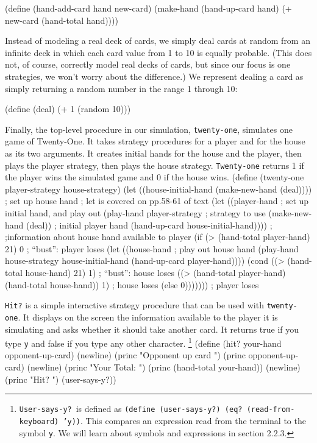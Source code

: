 \beginlisp
(define (hand-add-card hand new-card)
  (make-hand (hand-up-card hand)
             (+ new-card (hand-total hand))))
\endlisp

Instead of modeling a real deck of cards, we simply deal cards at
random from an infinite deck in which each card value from 1 to 10 is
equally probable.  (This does not, of course, correctly model real
decks of cards, but since our focus is one strategies, we won't worry
about the difference.)   We represent dealing a card as simply returning a
random number in the range 1 through 10:

\beginlisp
(define (deal) (+ 1 (random 10)))
\endlisp

Finally, the top-level procedure in our simulation, {\tt twenty-one},
simulates one game of Twenty-One.  It takes strategy procedures for a
player and for the house as its two arguments.  It creates initial
hands for the house and the player, then plays the player strategy,
then plays the house strategy.  {\tt Twenty-one} returns 1 if the
player wins the simulated game and 0 if the house wins.
\beginlisp
(define (twenty-one player-strategy house-strategy)
  (let ((house-initial-hand (make-new-hand (deal))))  ; set up house hand
        ; let is covered on pp.58-61 of text
    (let ((player-hand  ; set up initial hand, and play out
           (play-hand player-strategy  ; strategy to use
                      (make-new-hand (deal))  ; initial player hand
                      (hand-up-card house-initial-hand))))  ;
                            ;information about house hand available to player
      (if (> (hand-total player-hand) 21)
          0                                ; ``bust'': player loses
          (let ((house-hand   ; play out house hand
                 (play-hand house-strategy
                            house-initial-hand
                            (hand-up-card player-hand))))
            (cond ((> (hand-total house-hand) 21)
                   1)                      ; ``bust'': house loses
                  ((> (hand-total player-hand)
                      (hand-total house-hand))
                   1)                      ; house loses
                  (else 0)))))))           ; player loses
\endlisp

{\tt Hit?} is a simple interactive strategy procedure that can be used
with {\tt twenty-one}. It displays on the screen the information
available to the player it is simulating and asks whether it should
take another card.  It returns true if you type {\tt y} and false if
you type any other character.  \footnote{{\tt User-says-y?}\ is
defined as {\tt (define (user-says-y?) (eq?\ (read-from-keyboard)
'y))}.  This compares an expression read from the terminal to the
symbol {\tt y}.  We will learn about symbols and expressions in
section 2.2.3.}
\beginlisp
(define (hit? your-hand opponent-up-card)
  (newline)
  (princ "Opponent up card ")
  (princ opponent-up-card)
  (newline)
  (princ "Your Total: ")
  (princ (hand-total your-hand))
  (newline)
  (princ "Hit? ")
  (user-says-y?))
\endlisp
